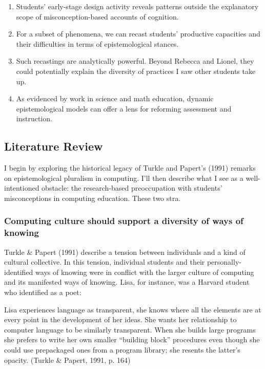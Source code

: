 \begin{enumerate}
\def\labelenumi{\arabic{enumi}.}
\item
  Students' early-stage design activity reveals patterns outside the
  explanatory scope of misconception-based accounts of cognition.
\item
  For a subset of phenomena, we can recast students' productive
  capacities and their difficulties in terms of epistemological stances.
\item
  Such recastings are analytically powerful. Beyond Rebecca and Lionel,
  they could potentially explain the diversity of practices I saw other
  students take up.
\item
  As evidenced by work in science and math education, dynamic
  epistemological models can offer a lens for reforming assessment and
  instruction.
\end{enumerate}

\subsection{Literature Review}\label{literature-review}

I begin by exploring the historical legacy of Turkle and Papert's (1991)
remarks on epistemological pluralism in computing. I'll then describe
what I see as a well-intentioned obstacle: the research-based
preoccupation with students' misconceptions in computing education.
These two stra.

\subsubsection{Computing culture should support a diversity of ways of
knowing}\label{computing-culture-should-support-a-diversity-of-ways-of-knowing}

Turkle \& Papert (1991) describe a tension between individuals and a
kind of cultural collective. In this tension, individual students and
their personally-identified ways of knowing were in conflict with the
larger culture of computing and its manifested ways of knowing. Lisa,
for instance, was a Harvard student who identified as a poet:

Lisa experiences language as transparent, she knows where all the
elements are at every point in the development of her ideas. She wants
her relationship to computer language to be similarly transparent. When
she builds large programs she prefers to write her own smaller
``building block'' procedures even though she could use prepackaged ones
from a program library; she resents the latter's opacity. (Turkle \&
Papert, 1991, p. 164)

